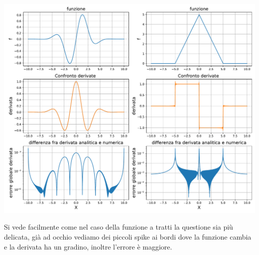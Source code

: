 \documentclass[10pt,a4paper]{article}
\begin{document}
\begin{center}
\includegraphics[scale=0.5]{img/cfr_derive_fft.pdf}
\end{center}

Si vede facilmente come nel caso della funzione a tratti la questione sia più delicata, già ad occhio vediamo dei piccoli spike ai bordi dove la funzione cambia e la derivata ha un gradino, inoltre l'errore è maggiore. 
\end{document}
